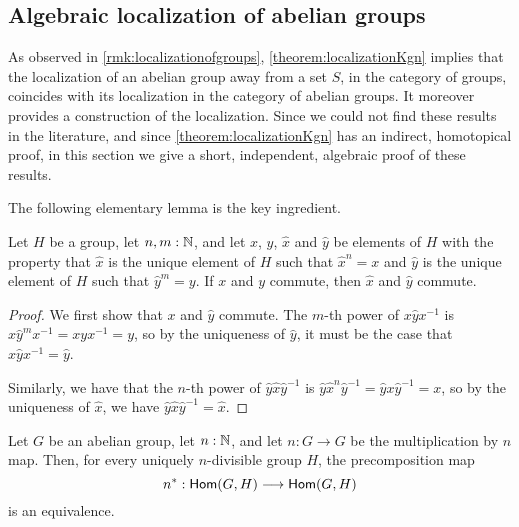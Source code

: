 \subsection{Algebraic localization of abelian groups}\label{ss:abelian}

As observed in \cref{rmk:localizationofgroups},
\cref{theorem:localizationKgn} implies that the localization of an abelian group
away from a set $S$, in the category of groups, coincides with its localization in
the category of abelian groups. It moreover provides a construction of the localization.
Since we could not find these results in the literature, and since \cref{theorem:localizationKgn}
has an indirect, homotopical proof, in this section we give a short, independent, algebraic proof
of these results.

The following elementary lemma is the key ingredient.
 
\begin{lem}
    Let $H$ be a group, let $n,m : \mathbb{N}$, and let $x$, $y$, $\hat{x}$ and $\hat{y}$ be
    elements of $H$ with the property that
    $\hat{x}$ is the unique element of $H$ such that $\hat{x}^n = x$ and
    $\hat{y}$ is the unique element of $H$ such that $\hat{y}^m = y$.
    If $x$ and $y$ commute, then $\hat{x}$ and $\hat{y}$ commute.
\end{lem}

\begin{proof}
    We first show that $x$ and $\hat{y}$ commute.
    The $m$-th power of $x \hat{y} x^{-1}$ is $x \hat{y}^m x^{-1} = x y x^{-1} = y$,
    so by the uniqueness of $\hat{y}$, it must be the case that $x \hat{y} x^{-1} = \hat{y}$.

    Similarly, we have that
    the $n$-th power of $\hat{y} \hat{x} \hat{y}^{-1}$ is
    $\hat{y} \hat{x}^n \hat{y}^{-1} = \hat{y} x \hat{y}^{-1} = x$,
    so by the uniqueness of $\hat{x}$, we have $\hat{y} \hat{x} \hat{y}^{-1} = \hat{x}$.
\end{proof}

\begin{prop}
    Let $G$ be an abelian group, let $n : \mathbb{N}$, and let $n : G \to G$ be the multiplication by $n$ map.
    Then, for every uniquely $n$-divisible group $H$, the precomposition map
    \[
        n^* : \mathsf{Hom}(G,H) \longrightarrow \mathsf{Hom}(G,H)
    \]
    is an equivalence.
\end{prop}

